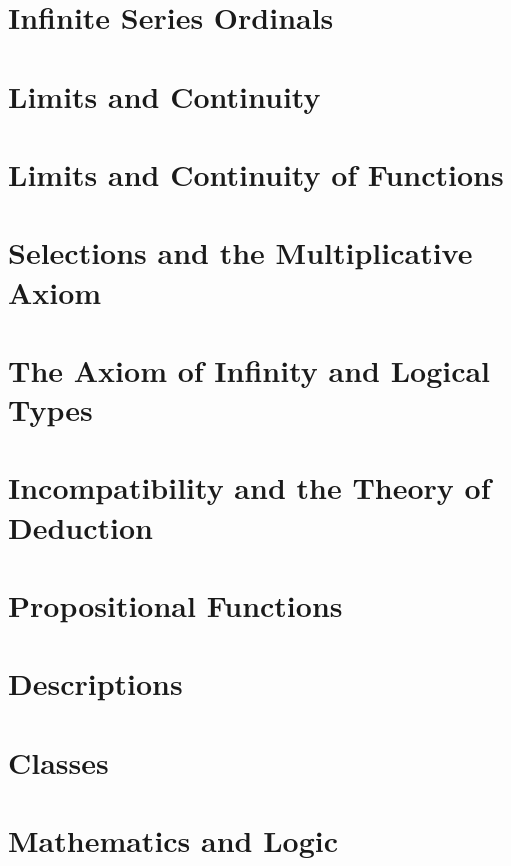 \documentclass{article}
\begin{document}
\section{Infinite Series Ordinals}

\section{Limits and Continuity}

\section{Limits and Continuity of Functions}

\section{Selections and the Multiplicative Axiom}

\section{The Axiom of Infinity and Logical Types}

\section{Incompatibility and the Theory of Deduction}

\section{Propositional Functions}

\section{Descriptions}

\section{Classes}

\section{Mathematics and Logic}
\end{document}
